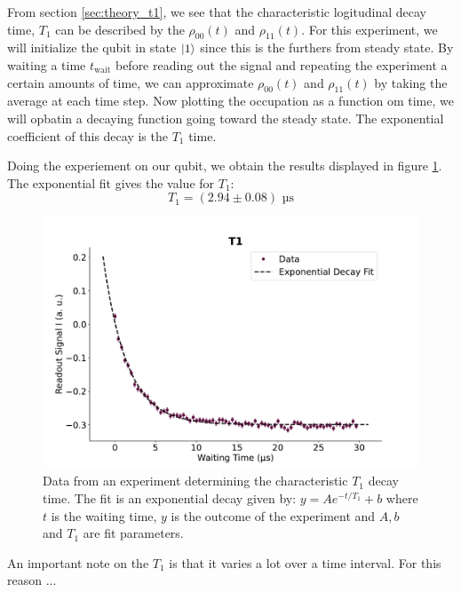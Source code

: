 From section \ref{sec:theory_t1}, we see that the characteristic logitudinal decay time, $T_1$ can be described by the $\rho_{00}(t)$ and $\rho_{11}(t)$. For this experiment, we will initialize the qubit in state $\ket{1}$ since this is the furthers from steady state. By waiting a time $t_{\text{wait}}$ before reading out the signal and repeating the experiment a certain amounts of time, we can approximate  $\rho_{00}(t)$ and $\rho_{11}(t)$ by taking the average at each time step. Now plotting the occupation as a function om time, we will opbatin a decaying function going toward the steady state. The exponential coefficient of this decay is the $T_1$ time. 


Doing the experiement on our qubit, we obtain the results displayed in figure \ref{fig:calibration_T_1_decay}. The exponential fit gives the value for $T_1$:
\begin{equation}
    T_1 = (2.94 \pm 0.08) \text{ µs}
\end{equation}

\begin{figure}
    \centering
    \includegraphics[]{Calibrations/Figures/T1.pdf}
    \caption{Data from an experiment determining the characteristic $T_1$ decay time. The fit is an exponential decay given by: $y = A e^{-t / T_1} + b$ where $t$ is the waiting time, $y$ is the outcome of the experiment and $A, b$ and $T_1$ are fit parameters.}
    \label{fig:calibration_T_1_decay}
\end{figure}

An important note on the $T_1$ is that it varies a lot over a time interval. For this reason ... 

